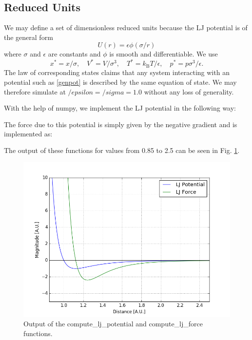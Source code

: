 \documentclass[11pt,a4paper]{scrartcl}
\makeatletter
\newcommand{\listfile}[7][MyPythonStyle]{
}
\makeatother
\begin{document}
\subsection{Reduced Units}
We may define a set of dimensionless reduced units because the LJ potential is of the general form
\begin{equation}\label{genpot}
U(r) = \epsilon \phi(\sigma/r)
\end{equation}
where $\sigma$ and $\epsilon$ are constants and $\phi$ is smooth and differentiable. We use
\begin{equation}
x^* = x/\sigma,\quad V^* = V/\sigma^3, \quad T^* = k_\mathrm{B} T/\epsilon,\quad p^* = p\sigma^3/\epsilon.
\end{equation}
The law of corresponding states claims that any system interacting with an potential such as \ref{genpot} is described by the same equation of state. We may therefore simulate at $/epsilon = /sigma = 1.0$ without any loss of generality.

With the help of numpy, we implement the LJ potential in the following way:
\listfile{../src/ljlib.py}{/src/ljlib.py}{10}{13}{LJ Potential}{ljpotential}
The force due to this potential is simply given by the negative gradient and is implemented as:
\listfile{../src/ljlib.py}{/src/ljlib.py}{15}{19}{LJ Force}{ljforce}
The output of these functions for values from 0.85 to 2.5 can be seen in Fig. \ref{fig:lj}.
\begin{figure}[h]
\includegraphics[width=0.7\linewidth]{../fig/ljplot.png}
  \centering
  \caption{Output of the compute\_lj\_potential and compute\_lj\_force functions.}
\label{fig:lj}
\end{figure}
\end{document}
